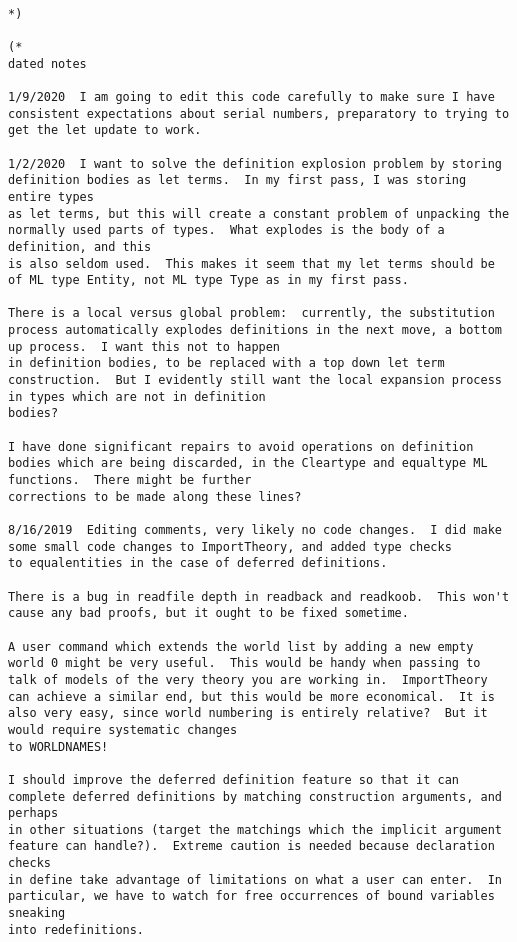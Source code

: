 \documentclass{article}
\begin{document}
{\tiny
\begin{verbatim}

*)

(*
dated notes

1/9/2020  I am going to edit this code carefully to make sure I have consistent expectations about serial numbers, preparatory to trying to get the let update to work.

1/2/2020  I want to solve the definition explosion problem by storing definition bodies as let terms.  In my first pass, I was storing entire types
as let terms, but this will create a constant problem of unpacking the normally used parts of types.  What explodes is the body of a definition, and this
is also seldom used.  This makes it seem that my let terms should be of ML type Entity, not ML type Type as in my first pass.

There is a local versus global problem:  currently, the substitution process automatically explodes definitions in the next move, a bottom up process.  I want this not to happen
in definition bodies, to be replaced with a top down let term construction.  But I evidently still want the local expansion process in types which are not in definition
bodies?

I have done significant repairs to avoid operations on definition bodies which are being discarded, in the Cleartype and equaltype ML functions.  There might be further
corrections to be made along these lines?

8/16/2019  Editing comments, very likely no code changes.  I did make some small code changes to ImportTheory, and added type checks
to equalentities in the case of deferred definitions.

There is a bug in readfile depth in readback and readkoob.  This won't cause any bad proofs, but it ought to be fixed sometime.

A user command which extends the world list by adding a new empty world 0 might be very useful.  This would be handy when passing to talk of models of the very theory you are working in.  ImportTheory can achieve a similar end, but this would be more economical.  It is also very easy, since world numbering is entirely relative?  But it would require systematic changes
to WORLDNAMES!

I should improve the deferred definition feature so that it can complete deferred definitions by matching construction arguments, and perhaps
in other situations (target the matchings which the implicit argument feature can handle?).  Extreme caution is needed because declaration checks
in define take advantage of limitations on what a user can enter.  In particular, we have to watch for free occurrences of bound variables sneaking
into redefinitions.


\end{verbatim}}
\end{document}
